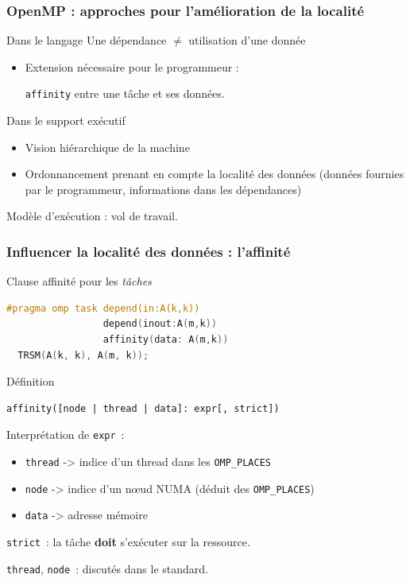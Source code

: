 \documentclass[xcolor={usenames,dvipsnames,svgnames,table}, aspectratio=43]{beamer}
\begin{document}
\begin{frame}[fragile]
\frametitle{OpenMP : approches pour l'amélioration de la localité}

  \begin{block}{Dans le langage}
    Une dépendance $\neq$ utilisation d'une donnée
    \begin{itemize}
      \item Extension nécessaire pour le programmeur :

        \verb/affinity/ entre une tâche et ses données.
    \end{itemize}
  \end{block}

  \begin{block}{Dans le support exécutif}
    \begin{itemize}
      \item Vision hiérarchique de la machine
      \item Ordonnancement prenant en compte la localité des données (données fournies par le programmeur, informations dans les dépendances)
    \end{itemize}
    Modèle d'exécution : vol de travail.
  \end{block}

\end{frame}

\begin{frame}[fragile]
\frametitle{Influencer la localité des données : l'affinité}

\begin{block}{Clause affinité pour les \textit{tâches}}
  \begin{lstlisting}[language=c, numbers=none, basicstyle=\scriptsize]
#pragma omp task depend(in:A(k,k))
                 depend(inout:A(m,k))
                 affinity(data: A(m,k))
  TRSM(A(k, k), A(m, k));
  \end{lstlisting}
\end{block}


\begin{block}{Définition}
  \begin{lstlisting}[numbers=none, basicstyle=\scriptsize]
  affinity([node | thread | data]: expr[, strict])
  \end{lstlisting}
  Interprétation de \texttt{expr}~:
  \begin{itemize}
    \item \texttt{thread} -> indice d'un thread dans les \verb/OMP_PLACES/
    \item \texttt{node} -> indice d'un nœud NUMA (déduit des \verb/OMP_PLACES/)
    \item \texttt{data} -> adresse mémoire
  \end{itemize}
  \texttt{strict}~: la tâche \textbf{doit} s'exécuter sur la ressource.

  \texttt{thread}, \texttt{node}~: discutés dans le standard.
\end{block}


\end{frame}
\end{document}
